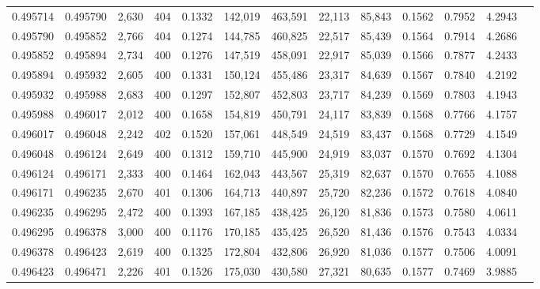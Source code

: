 \begin{tabular}{rrrrrrrrrrrrr}
0.495714 & 0.495790 & 2,630 & 404 &                                     0.1332 & 142,019 & 463,591 &  22,113 &  85,843 & 0.1562 & 0.7952 & 4.2943 \\
0.495790 & 0.495852 & 2,766 & 404 &                                     0.1274 & 144,785 & 460,825 &  22,517 &  85,439 & 0.1564 & 0.7914 & 4.2686 \\
0.495852 & 0.495894 & 2,734 & 400 &                                     0.1276 & 147,519 & 458,091 &  22,917 &  85,039 & 0.1566 & 0.7877 & 4.2433 \\
0.495894 & 0.495932 & 2,605 & 400 &                                     0.1331 & 150,124 & 455,486 &  23,317 &  84,639 & 0.1567 & 0.7840 & 4.2192 \\
0.495932 & 0.495988 & 2,683 & 400 &                                     0.1297 & 152,807 & 452,803 &  23,717 &  84,239 & 0.1569 & 0.7803 & 4.1943 \\
0.495988 & 0.496017 & 2,012 & 400 &                                     0.1658 & 154,819 & 450,791 &  24,117 &  83,839 & 0.1568 & 0.7766 & 4.1757 \\
0.496017 & 0.496048 & 2,242 & 402 &                                     0.1520 & 157,061 & 448,549 &  24,519 &  83,437 & 0.1568 & 0.7729 & 4.1549 \\
0.496048 & 0.496124 & 2,649 & 400 &                                     0.1312 & 159,710 & 445,900 &  24,919 &  83,037 & 0.1570 & 0.7692 & 4.1304 \\
0.496124 & 0.496171 & 2,333 & 400 &                                     0.1464 & 162,043 & 443,567 &  25,319 &  82,637 & 0.1570 & 0.7655 & 4.1088 \\
0.496171 & 0.496235 & 2,670 & 401 &                                     0.1306 & 164,713 & 440,897 &  25,720 &  82,236 & 0.1572 & 0.7618 & 4.0840 \\
0.496235 & 0.496295 & 2,472 & 400 &                                     0.1393 & 167,185 & 438,425 &  26,120 &  81,836 & 0.1573 & 0.7580 & 4.0611 \\
0.496295 & 0.496378 & 3,000 & 400 &                                     0.1176 & 170,185 & 435,425 &  26,520 &  81,436 & 0.1576 & 0.7543 & 4.0334 \\
0.496378 & 0.496423 & 2,619 & 400 &                                     0.1325 & 172,804 & 432,806 &  26,920 &  81,036 & 0.1577 & 0.7506 & 4.0091 \\
0.496423 & 0.496471 & 2,226 & 401 &                                     0.1526 & 175,030 & 430,580 &  27,321 &  80,635 & 0.1577 & 0.7469 & 3.9885 \\

\end{tabular}

